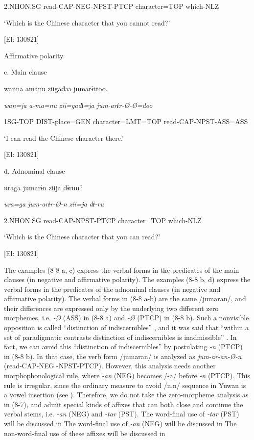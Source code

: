     2.NHON.SG  read-CAP-NEG-NPST-PTCP  character=TOP  which-NLZ

    ‘Which is the Chinese character that you cannot read?’

    [El: 130821]

  Affirmative polarity

  c.  Main clause

    wanna  amanu  ziigadəə  jumarɨttoo.

    \textit{wan=ja}  \textit{a-ma=nu}  \textit{zii=gadɨ=ja}  \textit{jum-arɨr-Ø-Ø=doo}

    1SG-TOP  DIST-place=GEN  character=LMT=TOP  read-CAP-NPST-ASS=ASS

    ‘I can read the Chinese character there.’

    [El: 130821]

  d.  Adnominal clause

    uraga  jumarɨn  ziija  dɨruu?

    \textit{ura=ga}  \textit{jum-arɨr-Ø-n}  \textit{zii=ja}  \textit{dɨ-ru}

    2.NHON.SG  read-CAP-NPST-PTCP  character=TOP  which-NLZ

    ‘Which is the Chinese character that you can read?’

    [El: 130821]

The examples (8-8 a, c) express the verbal forms in the predicates of the main clauses (in negative and affirmative polarity). The examples (8-8 b, d) express the verbal forms in the predicates of the adnominal clauses (in negative and affirmative polarity). The verbal forms in (8-8 a-b) are the same /jumaran/, and their differences are expressed only by the underlying two different zero morphemes, i.e. \textit{{}-Ø} (ASS) in (8-8 a) and \textit{{}-Ø} (PTCP) in (8-8 b). Such a nonvisible opposition is called “distinction of indiscernibles” \citep[36]{Haas1974}, and it was said that “within a set of paradigmatic contrasts distinction of indiscernibles is inadmissible” \citep[83]{McGregor2003}. In fact, we can avoid this “distinction of indiscernibles” by postulating \textit{{}-n} (PTCP) in (8-8 b). In that case, the verb form /jumaran/ is analyzed as \textit{jum-ar-an-Ø-n} (read-CAP-NEG -NPST-PTCP). However, this analysis needs another morphophonological rule, where \textit{{}-an} (NEG) becomes /-a/ before \textit{{}-n} (PTCP). This rule is irregular, since the ordinary measure to avoid /n.n/ sequence in Yuwan is a vowel insertion (see ). Therefore, we do not take the zero-morpheme analysis as in (8-7), and admit special kinds of affixes that can both close and continue the verbal stems, i.e. \textit{{}-an} (NEG) and \textit{{}-tar} (PST). The word-final use of \textit{{}-tar} (PST) will be discussed in  The word-final use of \textit{{}-an} (NEG) will be discussed in  The non-word-final use of these affixes will be discussed in 

